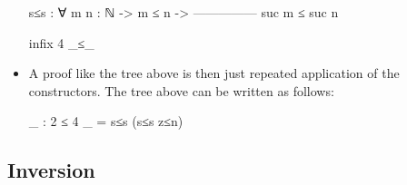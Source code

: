 \documentclass{lecturenotes}
\begin{document}
\begin{itemize}
\begin{code}
  s≤s : ∀ {m n : ℕ} ->
           m ≤ n ->
        ---------------
         suc m ≤ suc n

infix 4 _≤_
\end{code}
\item A proof like the tree above is then just repeated application of the constructors.
  The tree above can be written as follows:
\begin{code}
_ : 2 ≤ 4
_ = s≤s (s≤s z≤n)
\end{code}
  
\end{itemize}

\subsection{Inversion}
\label{sec:inversion}
\end{document}
